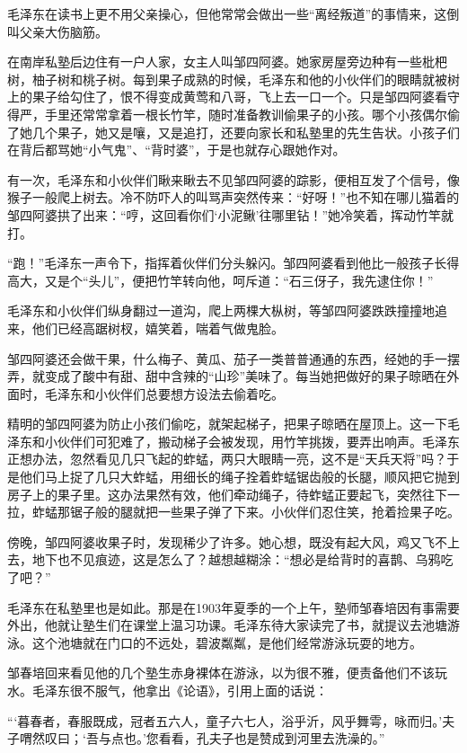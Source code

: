 \documentclass[../../dazhuan.tex]{subfiles}
\begin{document}
毛泽东在读书上更不用父亲操心，但他常常会做出一些“离经叛道”的事情来，这倒叫父亲大伤脑筋。

在南岸私塾后边住有一户人家，女主人叫邹四阿婆。她家房屋旁边种有一些枇杷树，柚子树和桃子树。每到果子成熟的时候，毛泽东和他的小伙伴们的眼睛就被树上的果子给勾住了，恨不得变成黄莺和八哥，飞上去一口一个。只是邹四阿婆看守得严，手里还常常拿着一根长竹竿，随时准备教训偷果子的小孩。哪个小孩偶尔偷了她几个果子，她又是嚷，又是追打，还要向家长和私塾里的先生告状。小孩子们在背后都骂她“小气鬼”、“背时婆”，于是也就存心跟她作对。

有一次，毛泽东和小伙伴们瞅来瞅去不见邹四阿婆的踪影，便相互发了个信号，像猴子一般爬上树去。冷不防吓人的叫骂声突然传来：“好呀！”也不知在哪儿猫着的邹四阿婆拱了出来：“哼，这回看你们‘小泥鳅’往哪里钻！”她冷笑着，挥动竹竿就打。

“跑！”毛泽东一声令下，指挥着伙伴们分头躲闪。邹四阿婆看到他比一般孩子长得高大，又是个“头儿”，便把竹竿转向他，呵斥道：“石三伢子，我先逮住你！”

毛泽东和小伙伴们纵身翻过一道沟，爬上两棵大枞树，等邹四阿婆跌跌撞撞地追来，他们已经高踞树杈，嬉笑着，喘着气做鬼脸。

邹四阿婆还会做干果，什么梅子、黄瓜、茄子一类普普通通的东西，经她的手一摆弄，就变成了酸中有甜、甜中含辣的“山珍”美味了。每当她把做好的果子晾晒在外面时，毛泽东和小伙伴们总要想方设法去偷着吃。

精明的邹四阿婆为防止小孩们偷吃，就架起梯子，把果子晾晒在屋顶上。这一下毛泽东和小伙伴们可犯难了，搬动梯子会被发现，用竹竿挑拨，要弄出响声。毛泽东正想办法，忽然看见几只飞起的蚱蜢，两只大眼睛一亮，这不是“天兵天将”吗？于是他们马上捉了几只大蚱蜢，用细长的绳子拴着蚱蜢锯齿般的长腿，顺风把它抛到房子上的果子里。这办法果然有效，他们牵动绳子，待蚱蜢正要起飞，突然往下一拉，蚱蜢那锯子般的腿就把一些果子弹了下来。小伙伴们忍住笑，抢着捡果子吃。

傍晚，邹四阿婆收果子时，发现稀少了许多。她心想，既没有起大风，鸡又飞不上去，地下也不见痕迹，这是怎么了？越想越糊涂：“想必是给背时的喜鹊、乌鸦吃了吧？”

毛泽东在私塾里也是如此。那是在1903年夏季的一个上午，塾师邹春培因有事需要外出，他就让塾生们在课堂上温习功课。毛泽东待大家读完了书，就提议去池塘游泳。这个池塘就在门口的不远处，碧波粼粼，是他们经常游泳玩耍的地方。

邹春培回来看见他的几个塾生赤身裸体在游泳，以为很不雅，便责备他们不该玩水。毛泽东很不服气，他拿出《论语》，引用上面的话说：

“‘暮春者，春服既成，冠者五六人，童子六七人，浴乎沂，风乎舞雩，咏而归。’夫子喟然叹曰；‘吾与点也。’您看看，孔夫子也是赞成到河里去洗澡的。”
\end{document}
